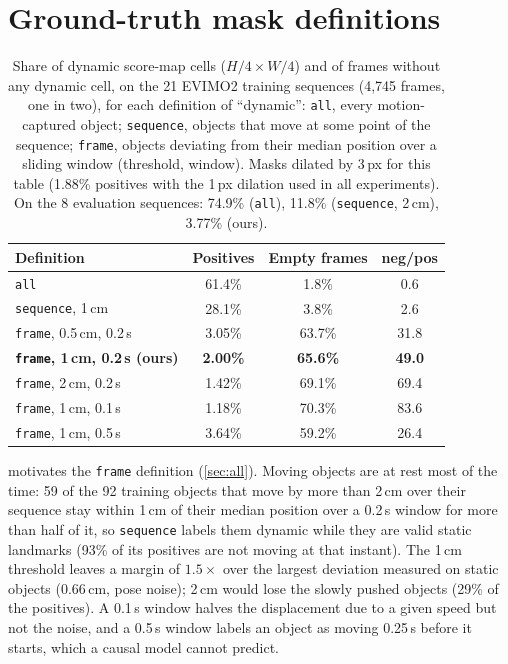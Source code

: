 \documentclass[conference]{IEEEtran}
\newcommand{\code}[1]{\texttt{#1}}
\begin{document}
\section{Ground-truth mask definitions}

\begin{table}[H]
\centering
\caption{Share of dynamic score-map cells ($H/4 \times W/4$) and of frames without any
dynamic cell, on the 21 EVIMO2 training sequences (4,745 frames, one in two), for each
definition of ``dynamic'': \code{all}, every motion-captured object; \code{sequence},
objects that move at some point of the sequence; \code{frame}, objects deviating from their
median position over a sliding window (threshold, window). Masks dilated by 3\,px for this
table (1.88\% positives with the 1\,px dilation used in all experiments). On the 8
evaluation sequences: 74.9\% (\code{all}), 11.8\% (\code{sequence}, 2\,cm), 3.77\% (ours).}
\label{tab:maskdef}
\begin{tabular}{lccc}
\toprule
Definition & Positives & Empty frames & neg/pos \\
\midrule
\code{all} & 61.4\% & 1.8\% & 0.6 \\
\code{sequence}, 1\,cm & 28.1\% & 3.8\% & 2.6 \\
\code{frame}, 0.5\,cm, 0.2\,s & 3.05\% & 63.7\% & 31.8 \\
\textbf{\code{frame}, 1\,cm, 0.2\,s (ours)} & \textbf{2.00\%} & \textbf{65.6\%} & \textbf{49.0} \\
\code{frame}, 2\,cm, 0.2\,s & 1.42\% & 69.1\% & 69.4 \\
\code{frame}, 1\,cm, 0.1\,s & 1.18\% & 70.3\% & 83.6 \\
\code{frame}, 1\,cm, 0.5\,s & 3.64\% & 59.2\% & 26.4 \\
\bottomrule
\end{tabular}
\end{table}

 motivates the \code{frame} definition (\cref{sec:all}). Moving objects
are at rest most of the time: 59 of the 92 training objects that move by more than 2\,cm
over their sequence stay within 1\,cm of their median position over a 0.2\,s window for
more than half of it, so \code{sequence} labels them dynamic while they are valid static
landmarks (93\% of its positives are not moving at that instant). The 1\,cm threshold
leaves a margin of $1.5\times$ over the largest deviation measured on static objects
(0.66\,cm, pose noise); 2\,cm would lose the slowly pushed objects (29\% of the
positives). A 0.1\,s window halves the displacement due to a given speed but not the noise,
and a 0.5\,s window labels an object as moving 0.25\,s before it starts, which a causal
model cannot predict.
\end{document}
